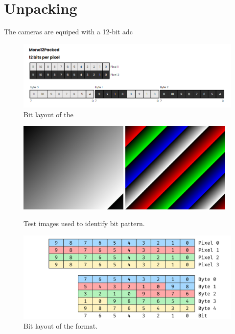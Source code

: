 \section {Unpacking}
\label{sec:unpacking}
The \lucid cameras are equiped with a 12-bit \gls{adc}

\begin{figure}
    \centering
    \includegraphics[width=\textwidth]{figures/polarized_image/Mono12Packed.png}
    \caption{Bit layout of the \cite{fisherRe15406LUT2023}}
    \label{fig:mono12packed}
\end{figure}




\begin{figure}[H]
    \centering
    \includegraphics[width=0.48\textwidth]{figures/unpacking/test_pattern0.jpg}
    \includegraphics[width=0.48\textwidth]{figures/unpacking/test_pattern2.jpg}
    \caption{Test images used to identify bit pattern.}
\end{figure}

\begin{figure}[H]
    \centering
    \includegraphics[width=\textwidth]{figures/unpacking/layout_10p.pdf}
    \caption{Bit layout of the  format.}
\end{figure}


